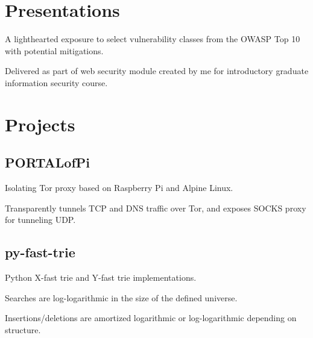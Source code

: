 \documentclass[]{deedy-resume-openfont}
\begin{document}
\begin{minipage}[t]{0.64\textwidth}

\section{Presentations} 
\begin{tightemize}
\item A lighthearted exposure to select vulnerability classes from the OWASP Top 10 with potential mitigations.
\item Delivered as part of web security module created by me for introductory graduate information security course.
\end{tightemize}
\sectionsep


\section{Projects}
\subsection{PORTALofPi}
\vspace{\topsep} %
\begin{tightemize}
\item Isolating Tor proxy based on Raspberry Pi and Alpine Linux.
\item Transparently tunnels TCP and DNS traffic over Tor, and exposes SOCKS proxy for tunneling UDP.
\end{tightemize}
\sectionsep

\subsection{py-fast-trie}
\vspace{\topsep} %
\begin{tightemize}
\item Python X-fast trie and Y-fast trie implementations.
\item Searches are log-logarithmic in the size of the defined universe.
\item Insertions/deletions are amortized logarithmic or log-logarithmic depending on structure.
\end{tightemize}
\sectionsep


\end{minipage}
\end{document}
